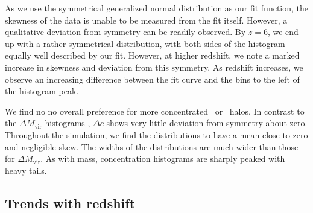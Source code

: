 As we use the symmetrical generalized normal distribution as our fit function, the skewness of the data is unable to be measured from the fit itself.  However, a qualitative deviation from symmetry can be readily observed.  By $z = 6$, we end up with a rather symmetrical distribution, with both sides of the histogram equally well described by our fit.  However, at higher redshift, we note a marked increase in skewness and deviation from this symmetry.  As redshift increases, we observe an increasing difference between the fit curve and the bins to the left of the histogram peak.

We find no no overall preference for more concentrated \lpt\ or \za\ halos.  In contrast to the $\Delta M_{\mathrm{vir}}$ histograms , $\Delta c$ shows very little deviation from symmetry about zero.  Throughout the simulation, we find the distributions to have a mean close to zero and negligible skew.  The widths of the distributions are much wider than those for $\Delta M_{\mathrm{vir}}$.  As with mass, concentration histograms are sharply peaked with heavy tails.




\subsection{Trends with redshift}


